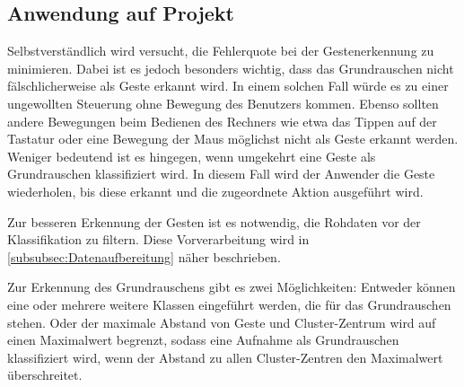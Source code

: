 \subsection{Anwendung auf Projekt}
Selbstverständlich wird versucht, die Fehlerquote bei der Gestenerkennung zu minimieren. Dabei ist es jedoch besonders wichtig, dass das Grundrauschen nicht fälschlicherweise als Geste erkannt wird. In einem solchen Fall würde es zu einer ungewollten Steuerung ohne Bewegung des Benutzers kommen.
Ebenso sollten andere Bewegungen beim Bedienen des Rechners wie etwa das Tippen auf der Tastatur oder eine Bewegung der Maus möglichst nicht als Geste erkannt werden.
Weniger bedeutend ist es hingegen, wenn umgekehrt eine Geste als Grundrauschen klassifiziert wird. In diesem Fall wird der Anwender die Geste wiederholen, bis diese erkannt und die zugeordnete Aktion ausgeführt wird.

Zur besseren Erkennung der Gesten ist es notwendig, die Rohdaten vor der Klassifikation zu filtern. Diese Vorverarbeitung wird in \autoref{subsubsec:Datenaufbereitung} näher beschrieben.

Zur Erkennung des Grundrauschens gibt es zwei Möglichkeiten: Entweder können eine oder mehrere weitere Klassen eingeführt werden, die für das Grundrauschen stehen. Oder der maximale Abstand von Geste und Cluster-Zentrum wird auf einen Maximalwert begrenzt, sodass
eine Aufnahme als Grundrauschen klassifiziert wird, wenn der Abstand zu allen Cluster-Zentren den Maximalwert überschreitet.


